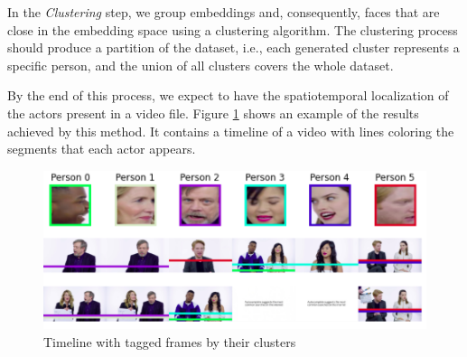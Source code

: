 In the \textit{Clustering} step, we group embeddings and, consequently, faces that are close in the embedding space using a clustering algorithm. 
The clustering process should produce a partition of the dataset, i.e., each generated cluster represents a specific person, and the union of all clusters covers the whole dataset.

By the end of this process, we expect to have the spatiotemporal localization of the actors present in a video file.
Figure \ref{fig:timeline} shows an example of the results achieved by this method. It contains a timeline of a video with lines coloring the segments that each actor appears.

\begin{figure}[!ht]
    \centering
    \includegraphics[width=0.6\linewidth]{img/face_clustering/timeline2.png}
    \caption{Timeline with tagged frames by their clusters}
    \label{fig:timeline}
\end{figure}

